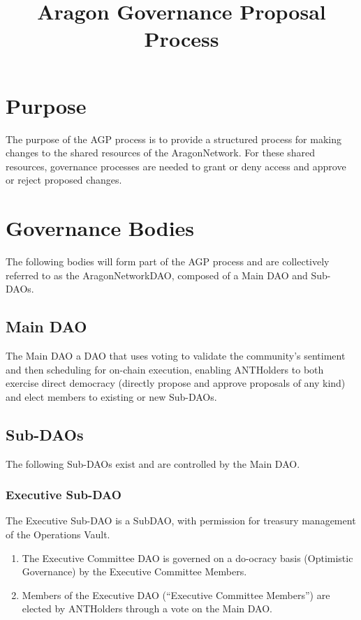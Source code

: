 
\title{Aragon Governance Proposal Process}



\mytitle

\section{Purpose}
The purpose of the \acf{AGP} process is to provide a structured process for making changes to the shared resources of the \gls{AragonNetwork}.
For these shared resources, governance processes are needed to grant or deny access and approve or reject proposed changes.

\section{Governance Bodies}

The following bodies will form part of the \ac{AGP} process and are collectively referred to as the \gls{AragonNetworkDAO}, composed of a Main \ac{DAO} and Sub-\acp{DAO}.

\subsection{Main \ac{DAO}}

The Main \ac{DAO} a \ac{DAO} that uses voting to validate the community’s sentiment and then scheduling for on-chain execution, enabling \glspl{ANTHolder} to both exercise direct democracy (directly propose and approve proposals of any kind) and elect members to existing or new Sub-\acp{DAO}.


\subsection{Sub-\acp{DAO}} 

The following Sub-\acp{DAO} exist and are controlled by the Main \ac{DAO}.


\subsubsection*{Executive Sub-\ac{DAO}}

The Executive Sub-\ac{DAO} is a Sub\ac{DAO}, with permission for treasury management of the Operations Vault.
\begin{enumerate}
	\item The Executive Committee \ac{DAO} is governed on a do-ocracy basis (Optimistic Governance) by the Executive Committee Members.
	\item Members of the Executive \ac{DAO} (``Executive Committee Members'') are elected by \glspl{ANTHolder} through a vote on the Main \ac{DAO}.
\end{enumerate}


